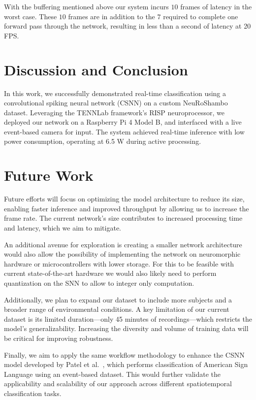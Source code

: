 \documentclass[conference]{IEEEtran}
\begin{document}
With the buffering mentioned above our system incurs $10$ frames of latency in the worst case. These $10$ frames are in addition to the $7$ required to complete one forward pass through the network, resulting in less than a second of latency at 20 FPS.

\section{Discussion and Conclusion}
\label{sec:conclusion}
In this work, we successfully demonstrated real-time classification using a convolutional spiking neural network (CSNN) on a custom NeuRoShambo dataset. Leveraging the TENNLab framework's RISP neuroprocessor, we deployed our network on a Raspberry Pi 4 Model B, and interfaced with a live event-based camera for input. The system achieved real-time inference with low power consumption, operating at 6.5 W during active processing.

\section{Future Work}
\label{sec:futurework}
Future efforts will focus on optimizing the model architecture to reduce its size, enabling faster inference and improved throughput by allowing us to increase the frame rate. The current network's size contributes to increased processing time and latency, which we aim to mitigate.

An additional avenue for exploration is creating a smaller network architecture would also allow the possibility of implementing the network on neuromorphic hardware or microcontrollers with lower storage. For this to be feasible with current state-of-the-art hardware we would also likely need to perform quantization on the SNN to allow to integer only computation.

Additionally, we plan to expand our dataset to include more subjects and a broader range of environmental conditions. A key limitation of our current dataset is its limited duration—only 45 minutes of recordings—which restricts the model's generalizability. Increasing the diversity and volume of training data will be critical for improving robustness.

Finally, we aim to apply the same workflow methodology to enhance the CSNN model developed by Patel et al.~\cite{patel2024}, which performs classification of American Sign Language using an event-based dataset. This would further validate the applicability and scalability of our approach across different spatiotemporal classification tasks.





\vspace{12pt}
\end{document}
